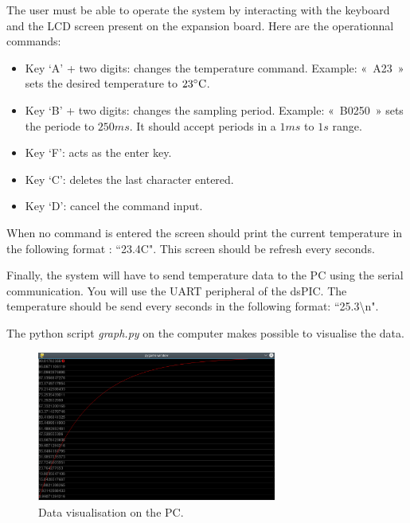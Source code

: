 \documentclass[11pt,a4paper]{article}
\theoremstyle{definition}%
\begin{document}
The user must be able to operate the system by interacting with the keyboard and the LCD screen present on the expansion board.
Here are the operationnal commands:
\begin{itemize}
	\item Key `A' + two digits: changes the temperature command.
	Example: «~A23~» sets the desired temperature to $23\celsius$.
	\item Key `B' + two digits: changes the sampling period.
	Example: «~B0250~» sets the periode to $250ms$.
	It should accept periods in a $1ms$ to $1s$ range.
	\item Key `F': acts as the enter key. 
	\item Key `C': deletes the last character entered.
	\item Key `D': cancel the command input.
\end{itemize}

When no command is entered the screen should print the current temperature in the following format : ``23.4C".
This screen should be refresh every seconds.

Finally, the system will have to send temperature data to the PC using the serial communication.
You will use the UART peripheral of the dsPIC.
The temperature should be send every seconds in the following format: ``25.3\textbackslash n".

The python script \textit{graph.py} on the computer makes possible to visualise the data.
\begin{figure}[H]
\center
\includegraphics[width=0.7\textwidth]{graph}
\caption{Data visualisation on the PC.}
\label{fig:graphpy}
\end{figure}





\end{document}
